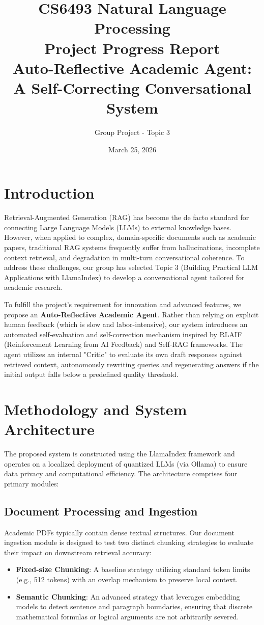 \documentclass[11pt,a4paper]{article}
\title{CS6493 Natural Language Processing \\ Project Progress Report \\ \large Auto-Reflective Academic Agent: A Self-Correcting Conversational System}
\author{Group Project - Topic 3}
\date{March 25, 2026}
\begin{document}
\maketitle

\section{Introduction}
Retrieval-Augmented Generation (RAG) has become the de facto standard for connecting Large Language Models (LLMs) to external knowledge bases. However, when applied to complex, domain-specific documents such as academic papers, traditional RAG systems frequently suffer from hallucinations, incomplete context retrieval, and degradation in multi-turn conversational coherence. To address these challenges, our group has selected Topic 3 (Building Practical LLM Applications with LlamaIndex) to develop a conversational agent tailored for academic research. 

To fulfill the project's requirement for innovation and advanced features, we propose an \textbf{Auto-Reflective Academic Agent}. Rather than relying on explicit human feedback (which is slow and labor-intensive), our system introduces an automated self-evaluation and self-correction mechanism inspired by RLAIF (Reinforcement Learning from AI Feedback) and Self-RAG frameworks. The agent utilizes an internal "Critic" to evaluate its own draft responses against retrieved context, autonomously rewriting queries and regenerating answers if the initial output falls below a predefined quality threshold.

\section{Methodology and System Architecture}
The proposed system is constructed using the LlamaIndex framework and operates on a localized deployment of quantized LLMs (via Ollama) to ensure data privacy and computational efficiency. The architecture comprises four primary modules:

\subsection{Document Processing and Ingestion}
Academic PDFs typically contain dense textual structures. Our document ingestion module is designed to test two distinct chunking strategies to evaluate their impact on downstream retrieval accuracy:
\begin{itemize}
    \item \textbf{Fixed-size Chunking}: A baseline strategy utilizing standard token limits (e.g., 512 tokens) with an overlap mechanism to preserve local context.
    \item \textbf{Semantic Chunking}: An advanced strategy that leverages embedding models to detect sentence and paragraph boundaries, ensuring that discrete mathematical formulas or logical arguments are not arbitrarily severed.
\end{itemize}
\end{document}
